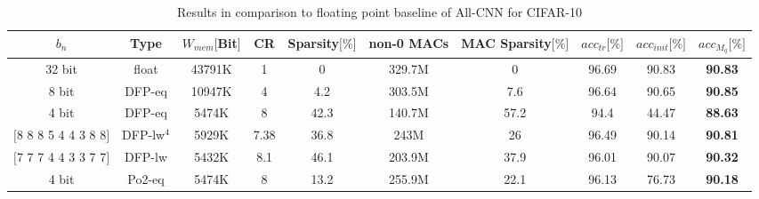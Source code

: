 \begin{table}[ht!]
  \caption{Results in comparison to floating point baseline of All-CNN for CIFAR-10}
  \label{tab:res_CIFAR10}
  \begin{tabular}{cc|ccc|cc|ccc}
\hline
    	$b_n$&Type&$W_{mem}\lbrack$Bit$\rbrack$&CR& Sparsity$\lbrack\%\rbrack$ & non-0 MACs & MAC Sparsity$\lbrack\%\rbrack$ & $acc_{tr}\lbrack\%\rbrack$ & $acc_{init}\lbrack\%\rbrack$ & $acc_{M_q}\lbrack\%\rbrack$\\
\hline
 		32 bit & float & 43791K & 1 & 0 & 329.7M & 0 & 96.69 &  90.83 &  \textbf{90.83} \\
\hline
  		8 bit & DFP-eq\footnotemark & 10947K & 4 & 4.2 & 303.5M & 7.6 & 96.64 & 90.65 & \textbf{90.85}\\
 		4 bit & DFP-eq & 5474K & 8 & 42.3 & 140.7M & 57.2 & 94.4 & 44.47 & \textbf{88.63}\\
\hline
              	$\lbrack$8 8 8 5 4 4 3 8 8$\rbrack$ & DFP-lw$^4$ &5929K& 7.38& 36.8 & 243M & 26 & 96.49 & 90.14 &\textbf{90.81}\\
              	$\lbrack$7 7 7 4 4 3 3 7 7$\rbrack$ & DFP-lw &5432K& 8.1&46.1&203.9M&37.9&96.01&90.07&\textbf{90.32}\\

 \hline
 		4 bit & Po2-eq & 5474K & 8 & 13.2 & 255.9M &  22.1 &96.13&76.73&\textbf{90.18}\\
\hline
\end{tabular}
\end{table}

